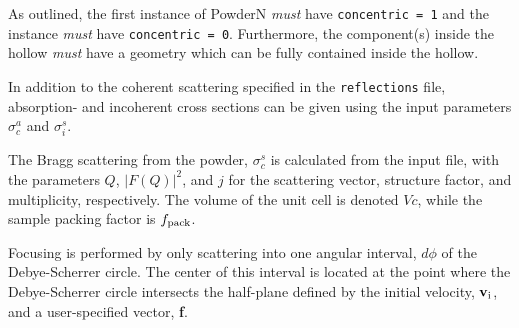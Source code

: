 As outlined, the first instance of PowderN \emph{must} have \verb+concentric = 1+ and the instance \emph{must}
have \verb+concentric = 0+. Furthermore, the component(s) inside the hollow \emph{must} have a geometry which can
be fully contained inside the hollow.


In addition to the coherent scattering specified in the \verb+reflections+ file, absorption- and incoherent 
cross sections can be given using the input parameters $\sigma_c^a$ and $\sigma_i^s$.


The Bragg scattering from the powder,
$\sigma_c^s$ is calculated from the input file, with the parameters
$Q$, $|F(Q)|^2$, and $j$ for the scattering vector, structure factor, and
multiplicity, respectively. The volume of the unit cell is denoted $Vc$,
while the sample packing factor is $f_{\rm pack}$.



Focusing is performed by only scattering into one angular
interval, $d\phi$ of the Debye-Scherrer circle. The center of this
interval is located at the point where the Debye-Scherrer circle
intersects the half-plane defined by the initial velocity, ${\bf v}_{\rm i}$,
and a user-specified vector, {\bf f}.

%


